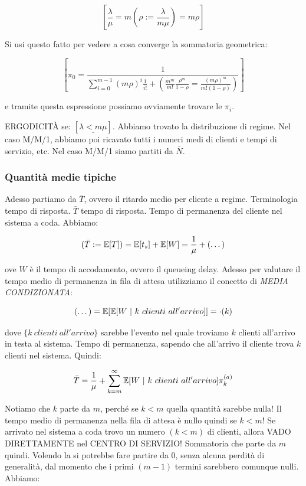 \[	
	[\frac{\lambda}{\mu} = m(\rho := \frac{\lambda}{m\mu}) = m\rho]
\]

Si usi questo fatto per vedere a cosa converge la sommatoria geometrica:

\[	
	[\pi_0 = \frac{1}{\sum_{i=0}^{m-1}{(m\rho)^i \frac{1}{i!}} + (\frac{m^m}{m!} \frac{\rho^m}{1-\rho} = \frac{(m\rho)^m}{m!(1-\rho)})}]
\]

e tramite questa espressione possiamo ovviamente trovare le $\pi_i$.

ERGODICIT\`A se: $[\underline{\lambda < m\mu}]$. Abbiamo trovato la distribuzione di regime. Nel caso M/M/1, abbiamo poi ricavato tutti i numeri medi di clienti e tempi di servizio, etc. Nel caso M/M/1 siamo partiti da $\bar{N}$.

\subsubsection{Quantità medie tipiche}

Adesso partiamo da $\bar{T}$, ovvero il ritardo medio per cliente a regime. Terminologia tempo di risposta. $\bar{T}$ tempo di risposta. Tempo di permanenza del cliente nel sistema a coda. Abbiamo:

\[
	(\bar{T} := \operatorname{\mathbb{E}}[T]) = \operatorname{\mathbb{E}}[t_s] + \operatorname{\mathbb{E}}[W] = \frac{1}{\mu} + (\dots)
\]

ove $W$ è il tempo di accodamento, ovvero il queueing delay. Adesso per valutare il tempo medio di permanenza in fila di attesa utilizziamo il concetto di \textit{MEDIA CONDIZIONATA}:

\[
	(\dots) = \E[\E[W\ |\ k\ clienti\ all'arrivo]] = \mathord{\cdot}(k)
\]

dove $\{k\ clienti\ all'arrivo\}$ sarebbe l'evento nel quale troviamo $k$ clienti all'arrivo in testa al sistema. Tempo di permanenza, sapendo che all'arrivo il cliente trova $k$ clienti nel sistema. Quindi:

\[
	\bar{T} = \frac{1}{\mu} + \sum_{k=m}^\infty{\E[W\ |\ k\ clienti\ all'arrivo]}\pi_k^{(a)}
\]

Notiamo che $k$ parte da $m$, perché se $k<m$ quella quantità sarebbe nulla!
Il tempo medio di permanenza nella fila di attesa è nullo quindi se $k<m$! Se arrivato nel sistema a coda trovo un numero $(k<m)$ di clienti, allora VADO DIRETTAMENTE nel CENTRO DI SERVIZIO! Sommatoria che parte da $m$ quindi. Volendo la si potrebbe fare partire da 0, senza alcuna perdità di generalità, dal momento che i primi $(m-1)$ termini sarebbero comunque nulli. Abbiamo:

